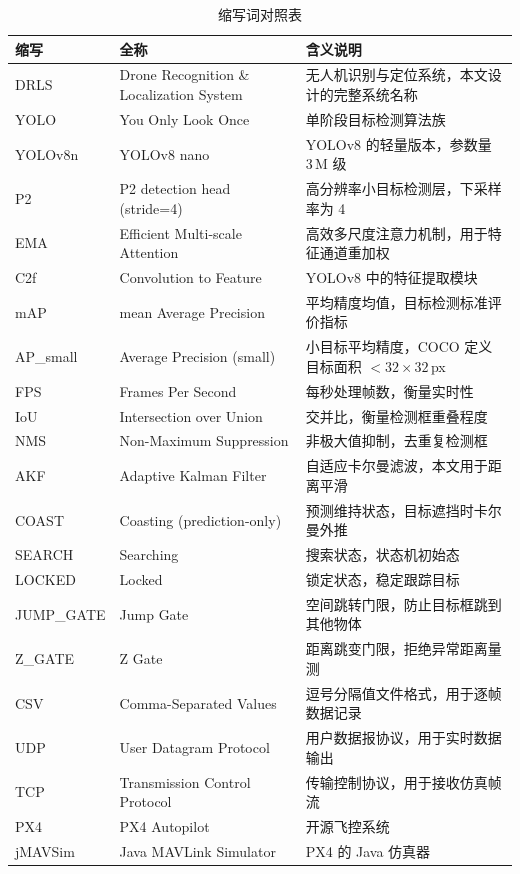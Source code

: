 \documentclass[12pt, a4paper]{ctexart}
\begin{document}
\begin{table}[H]
\centering
\caption{缩写词对照表}
\label{tab:glossary}
\small
\begin{tabular}{p{2.5cm}p{4cm}p{7cm}}
\toprule
\textbf{缩写} & \textbf{全称} & \textbf{含义说明} \\
\midrule
DRLS & Drone Recognition \& Localization System & 无人机识别与定位系统，本文设计的完整系统名称 \\
YOLO & You Only Look Once & 单阶段目标检测算法族 \\
YOLOv8n & YOLOv8 nano & YOLOv8 的轻量版本，参数量 3\,M 级 \\
P2 & P2 detection head (stride=4) & 高分辨率小目标检测层，下采样率为 4 \\
EMA & Efficient Multi-scale Attention & 高效多尺度注意力机制，用于特征通道重加权 \\
C2f & Convolution to Feature & YOLOv8 中的特征提取模块 \\
mAP & mean Average Precision & 平均精度均值，目标检测标准评价指标 \\
AP\_small & Average Precision (small) & 小目标平均精度，COCO 定义目标面积 $< 32 \times 32$\,px \\
FPS & Frames Per Second & 每秒处理帧数，衡量实时性 \\
IoU & Intersection over Union & 交并比，衡量检测框重叠程度 \\
NMS & Non-Maximum Suppression & 非极大值抑制，去重复检测框 \\
AKF & Adaptive Kalman Filter & 自适应卡尔曼滤波，本文用于距离平滑 \\
COAST & Coasting (prediction-only) & 预测维持状态，目标遮挡时卡尔曼外推 \\
SEARCH & Searching & 搜索状态，状态机初始态 \\
LOCKED & Locked & 锁定状态，稳定跟踪目标 \\
JUMP\_GATE & Jump Gate & 空间跳转门限，防止目标框跳到其他物体 \\
Z\_GATE & Z Gate & 距离跳变门限，拒绝异常距离量测 \\
CSV & Comma-Separated Values & 逗号分隔值文件格式，用于逐帧数据记录 \\
UDP & User Datagram Protocol & 用户数据报协议，用于实时数据输出 \\
TCP & Transmission Control Protocol & 传输控制协议，用于接收仿真帧流 \\
PX4 & PX4 Autopilot & 开源飞控系统 \\
jMAVSim & Java MAVLink Simulator & PX4 的 Java 仿真器 \\

\end{tabular}
\end{table}
\end{document}
